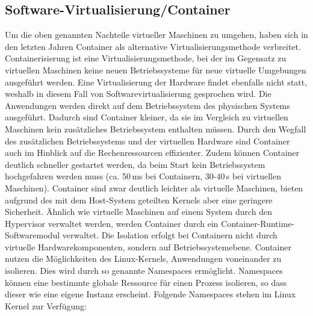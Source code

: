 \subsection{Software-Virtualisierung/Container}
\label{sub:SoftwareVirtualisierung/Container}
Um die oben genannten Nachteile virtueller Maschinen zu umgehen, haben sich in den letzten Jahren Container als alternative Virtualisierungsmethode verbreitet. Containerisierung ist eine Virtualisierungsmethode, bei der im Gegensatz zu virtuellen Maschinen keine neuen Betriebssysteme für neue virtuelle Umgebungen ausgeführt werden. Eine Virtualisierung der Hardware findet ebenfalls nicht statt, weshalb in diesem Fall von Softwarevirtualisierung gesprochen wird. Die Anwendungen werden direkt auf dem Betriebssystem des physischen Systems ausgeführt. Dadurch sind Container kleiner, da sie im Vergleich zu virtuellen Maschinen kein zusätzliches Betriebssystem enthalten müssen. Durch den Wegfall des zusätzlichen Betriebssystems und der virtuellen Hardware sind Container auch im Hinblick auf die Rechenressourcen effizienter. Zudem können Container deutlich schneller gestartet werden, da beim Start kein Betriebssystem hochgefahren werden muss (ca. 50\,ms bei Containern, 30-40\,s bei virtuellen Maschinen). \cite{Martin2018} Container sind zwar deutlich leichter als virtuelle Maschinen, bieten aufgrund des mit dem Host-System geteilten Kernels aber eine geringere Sicherheit. Ähnlich wie virtuelle Maschinen auf einem System durch den Hypervisor verwaltet werden, werden Container durch ein Container-Runtime-Softwaremodul verwaltet. Die Isolation erfolgt bei Containern nicht durch virtuelle Hardwarekomponenten, sondern auf Betriebssystemebene. Container nutzen die Möglichkeiten des Linux-Kernels, Anwendungen voneinander zu isolieren. Dies wird durch so genannte Namespaces ermöglicht. Namespaces können eine bestimmte globale Ressource für einen Prozess isolieren, so dass dieser wie eine eigene Instanz erscheint. Folgende Namespaces stehen im Linux Kernel zur Verfügung:
